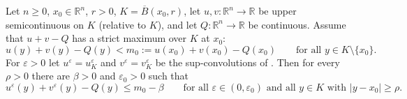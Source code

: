 \begin{lemma}
Let $n\ge0$, $x_0\in\mathbb R^n$, $r>0$, $K=\overline B(x_0,r)$, let $u,v:\mathbb R^n\to\mathbb R$ be upper semicontinuous on $K$ (relative to $K$), and let $Q:\mathbb R^n\to\mathbb R$ be continuous. Assume that $u+v-Q$ has a strict maximum over $K$ at $x_0$:
\[
u(y)+v(y)-Q(y)<m_0:=u(x_0)+v(x_0)-Q(x_0)\qquad\text{for all }y\in K\setminus\{x_0\}.
\]
For $\varepsilon>0$ let $u^\varepsilon=u^\varepsilon_K$ and $v^\varepsilon=v^\varepsilon_K$ be the sup-convolutions of . Then for every $\rho>0$ there are $\beta>0$ and $\varepsilon_0>0$ such that
\[
u^\varepsilon(y)+v^\varepsilon(y)-Q(y)\le m_0-\beta\qquad\text{for all }\varepsilon\in(0,\varepsilon_0)\text{ and all }y\in K\text{ with }|y-x_0|\ge\rho .
\]
\end{lemma}
